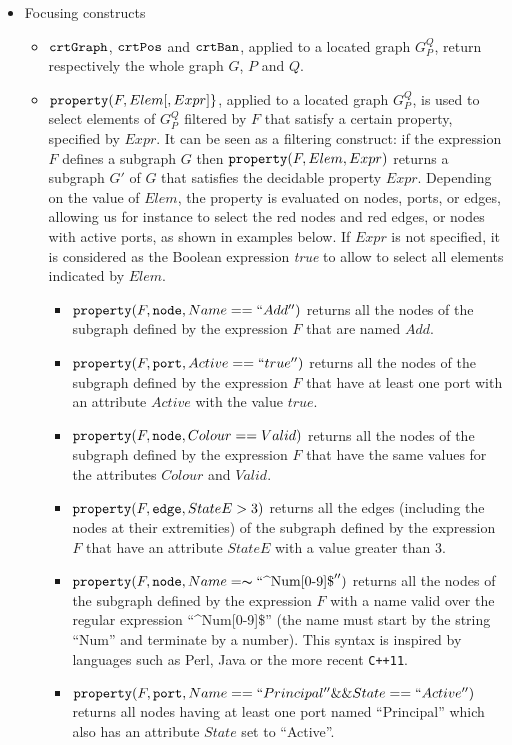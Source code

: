 \documentclass[a4paper,10pt,runningheads]{llncs}
\newcommand{\CrtGraph}{{\tt crtGraph}}
\newcommand{\CrtPos}{{\tt crtPos}}
\newcommand{\CrtBan}{{\tt crtBan}}
\newcommand{\Node}{{\tt node}}
\newcommand{\Edge}{{\tt edge}}
\newcommand{\Port}{{\tt port}}
\newcommand{\Property}[3]{{\tt property(}#1, #2, #3{\tt )}}
\begin{document}
\begin{itemize}

\item
Focusing constructs  
\begin{itemize}
\item 
$\CrtGraph$, $\CrtPos$ and $\CrtBan$, applied to a located graph
  $G_P^Q$, return respectively the whole graph $G$, $P$ and $Q$.

\item
${\tt property(}F, Elem [, Expr]{\tt \}}$, applied to a located graph
  $G_P^Q$, is used to select elements of $G_P^Q$ filtered by $F$ that
  satisfy a certain property, specified by $Expr$. It can be seen as a
  filtering construct: if the expression $F$ defines a subgraph $G$
  then $\Property{F}{Elem}{Expr}$ returns a subgraph $G'$ of
  $G$ that satisfies the decidable property $Expr$. Depending on the value of $Elem$, the property is
  evaluated on nodes, ports, or edges, allowing us for instance to
  select the red nodes and red edges, or nodes with active ports, as
  shown in examples below. %
  If $Expr$ is not specified, it is considered as the Boolean expression \textit{true} to allow to select all elements indicated by $Elem$.

 \begin{itemize}
  
   \item $\Property{F}{\Node}{Name == ``Add''}$ returns all the nodes of the subgraph defined by the expression $F$ that are named $Add$.

   \item $\Property{F}{\Port}{Active == ``true''}$ returns all the nodes
 of the subgraph defined by the expression $F$ that have at least one port with
an attribute $Active$ with the value $true$.
  
   \item $\Property{F}{\Node}{Colour == Valid}$ returns all the nodes
     of the subgraph defined by the expression  $F$ that have  the
     same values for the attributes  $Colour$ and $Valid$.

 \item $\Property{F}{\Edge}{StateE > 3}$ returns all the edges (including the nodes at their 
extremities) of the subgraph defined by the expression  $F$ that have an attribute  $StateE$ with a 
value greater than $3$.
 
 \item $\Property{F}{\Node}{Name =\thicksim ``\text{\textasciicircum{}Num[0-9]\$}''}$ returns all 
the nodes of the subgraph defined by the expression $F$ with a name valid over the regular 
expression ``{\textasciicircum}Num[0-9]\$'' (the name must start by the string ``Num'' and terminate 
by a number). This syntax is inspired by languages such as Perl, Java or the more recent 
\texttt{C++11}.
 \item $\Property{F}{\Port}{Name == ``Principal'' \&\& State ==``Active''}$ returns 
all nodes having at least one port named ``Principal'' which also has an attribute $State$ 
set to ``Active''.
 

\end{itemize}
\end{itemize}
\end{itemize}
\end{document}
